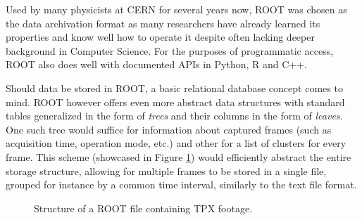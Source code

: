 
Used by many physicists at CERN for several years now, ROOT was chosen as the data archivation format as many researchers have already learned its properties and know well how to operate it despite often lacking deeper background in Computer Science. For the purposes of programmatic access, ROOT also does well with documented APIs in Python, R and C++.

Should data be stored in ROOT, a basic relational database concept comes to mind. ROOT however offers even more abstract data structures with standard tables generalized in the form of \textit{trees} and their columns in the form of \textit{leaves}. One such tree would suffice for information about captured frames (such as acquisition time, operation mode, etc.) and other for a list of clusters for every frame. This scheme (showcased in Figure \ref{fig:root-trees}) would efficiently abstract the entire storage structure, allowing for multiple frames to be stored in a single file, grouped for instance by a common time interval, similarly to the text file format.

\begin{figure}[t]
\begin{center}


\caption{Structure of a ROOT file containing TPX footage.}
\label{fig:root-trees}
\end{center}
\end{figure}


